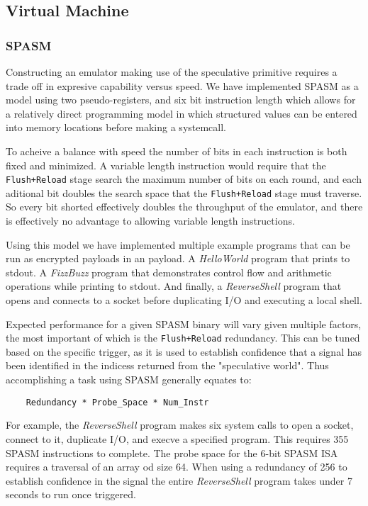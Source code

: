 \FigSpecBandwidth

\subsection{Virtual Machine}


\subsubsection{SPASM}
\label{subsubsec:spasm}
Constructing an emulator making use of the speculative primitive requires  
a trade off in expresive capability versus speed. 
We have implemented SPASM as a model using two pseudo-registers, and six 
bit instruction length which allows for a relatively direct programming model 
in which structured values can be entered into memory locations before making 
a systemcall.

To acheive a balance with speed the number of bits in each instruction is both 
fixed and minimized.  A variable length instruction would require that the 
\texttt{Flush+Reload} stage search the maximum number of bits on each round, and each 
aditional bit doubles the search space that the \texttt{Flush+Reload} stage must 
traverse.  So every bit shorted effectively doubles the throughput of the 
emulator, and there is effectively no advantage to allowing variable length 
instructions. 

Using this model we have implemented multiple example programs that can be run
as encrypted payloads in an \speculake payload. A \textit{HelloWorld} program 
that prints to stdout. A \textit{FizzBuzz} program that demonstrates control 
flow and arithmetic operations while printing to stdout. And finally,
a \textit{ReverseShell} program that opens and connects to a socket before  
duplicating I/O and executing a local shell. 

Expected performance for a given SPASM binary will vary given multiple factors, 
the most important of which is the \texttt{Flush+Reload} redundancy. This can be tuned
based on the specific trigger, as it is used to establish confidence that a signal 
has been identified in the indicess returned from the "speculative world". 
Thus accomplishing a task using SPASM generally equates to:

\begin{lstlisting}
    Redundancy * Probe_Space * Num_Instr
\end{lstlisting}

For example, the \textit{ReverseShell} program makes six system calls to open a socket,
connect to it, duplicate I/O, and execve a specified program. This requires 355
SPASM instructions to complete. The probe space for the 6-bit SPASM ISA requires 
a traversal of an array od size 64. When using a redundancy of 256 to establish
confidence in the signal the entire \textit{ReverseShell} program takes under 7 
seconds to run once triggered. 

